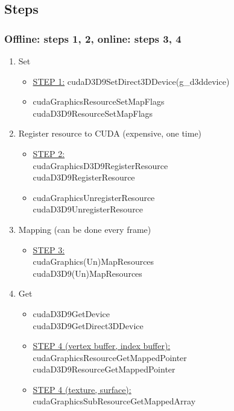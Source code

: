 \subsection{Steps}
\begin{frame}\frametitle{Offline: steps 1, 2, online: steps 3, 4}\logoEvolution\mypagenum
	\begin{enumerate}
		\item Set
			\begin{itemize}\tiny
			\item \underline{STEP 1:} {\color{red}cudaD3D9SetDirect3DDevice}(g\_d3ddevice)
			\item {\color{red}cudaGraphicsResourceSetMapFlags}\\  
				{\color{blue}cudaD3D9ResourceSetMapFlags}
			\end{itemize}
		\item Register resource to CUDA {\tiny (expensive, one time)}
			\begin{itemize}\tiny			
			\item \underline{STEP 2:}\\ {\color{red}cudaGraphicsD3D9RegisterResource}\\ {\color{blue}cudaD3D9RegisterResource}
			\item  {\color{red}cudaGraphicsUnregisterResource}\\
				  {\color{blue}cudaD3D9UnregisterResource}
			\end{itemize}
		\item Mapping {\tiny (can be done every frame)}
			\begin{itemize}\tiny
			\item \underline{STEP 3:}\\
			 {\color{red}cudaGraphics(Un)MapResources}\\
			 {\color{blue}cudaD3D9(Un)MapResources}
			\end{itemize}
		\item Get
			\begin{itemize}\tiny
			\item {\color{red}cudaD3D9GetDevice}\\ {\color{blue}cudaD3D9GetDirect3DDevice}
			\item \underline{STEP 4 (vertex buffer, index buffer):}\\ 		  {\color{red}cudaGraphicsResourceGetMappedPointer}\\
{\color{blue}cudaD3D9ResourceGetMappedPointer}
			\item \underline{STEP 4 (texture, surface):}\\ {\color{red}cudaGraphicsSubResourceGetMappedArray}\\

\end{itemize}
\end{enumerate}
\end{frame}
